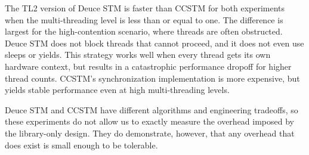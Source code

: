The TL2 version of Deuce STM is faster than CCSTM for both experiments when
the multi-threading level is less than or equal to one.  The difference
is largest for the high-contention scenario, where threads are often
obstructed.  Deuce STM does not block threads that cannot proceed, and it
does not even use sleeps or yields.  This strategy works well when every
thread gets its own hardware context, but results in a catastrophic
performance dropoff for higher thread counts.  CCSTM's synchronization
implementation is more expensive, but yields stable performance even at
high multi-threading levels.

Deuce STM and CCSTM have different algorithms and engineering tradeoffs,
so these experiments do not allow us to exactly measure the overhead
imposed by the library-only design.  They do demonstrate, however,
that any overhead that does exist is small enough to be tolerable.
